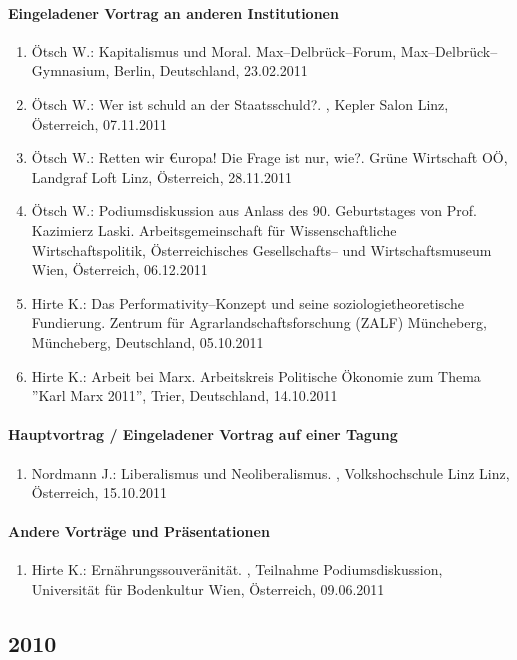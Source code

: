 \paragraph{Eingeladener Vortrag an anderen Institutionen}
\begin{enumerate}
	\item Ötsch W.: Kapitalismus und Moral. Max--Delbrück--Forum, Max--Delbrück--Gymnasium, Berlin, Deutschland, 23.02.2011
	\item Ötsch W.: Wer ist schuld an der Staatsschuld?. , Kepler Salon Linz, Österreich, 07.11.2011
	\item Ötsch W.: Retten wir €uropa! Die Frage ist nur, wie?. Grüne Wirtschaft OÖ, Landgraf Loft Linz, Österreich, 28.11.2011
	\item Ötsch W.: Podiumsdiskussion aus Anlass des 90. Geburtstages von Prof. Kazimierz Laski. Arbeitsgemeinschaft für Wissenschaftliche Wirtschaftspolitik, Österreichisches Gesellschafts-- und Wirtschaftsmuseum Wien, Österreich, 06.12.2011
	\item Hirte K.: Das Performativity--Konzept und seine soziologietheoretische Fundierung. Zentrum für Agrarlandschaftsforschung (ZALF) Müncheberg, Müncheberg, Deutschland, 05.10.2011
	\item Hirte K.: Arbeit bei Marx. Arbeitskreis Politische Ökonomie zum Thema ''Karl Marx 2011'', Trier, Deutschland, 14.10.2011
\end{enumerate}
\paragraph{Hauptvortrag / Eingeladener Vortrag auf einer Tagung}
\begin{enumerate}
	\item Nordmann J.: Liberalismus und Neoliberalismus. , Volkshochschule Linz Linz, Österreich, 15.10.2011
\end{enumerate}
\paragraph{Andere Vorträge und Präsentationen}
\begin{enumerate}
	\item Hirte K.: Ernährungssouveränität. , Teilnahme Podiumsdiskussion, Universität für Bodenkultur Wien, Österreich, 09.06.2011
\end{enumerate}
\subsection*{2010}
